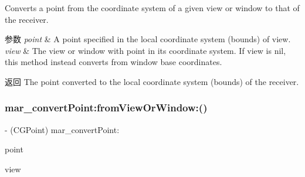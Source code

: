 Converts a point from the coordinate system of a given view or window to that of the receiver.


\begin{DoxyParams}{参数}
{\em point} & A point specified in the local coordinate system (bounds) of view. \\
\hline
{\em view} & The view or window with point in its coordinate system. If view is nil, this method instead converts from window base coordinates. \\
\hline
\end{DoxyParams}
\begin{DoxyReturn}{返回}
The point converted to the local coordinate system (bounds) of the receiver. 
\end{DoxyReturn}
\mbox{\label{category_u_i_view_07_m_a_r_e_x_08_a7c06e8f8cfa0ac108deb3fcbeb59fee9}} 
\subsubsection{\texorpdfstring{mar\+\_\+convert\+Point\+:from\+View\+Or\+Window\+:()}{mar\_convertPoint:fromViewOrWindow:()}\hspace{0.1cm}{\footnotesize\ttfamily [2/2]}}
{\footnotesize\ttfamily -\/ (C\+G\+Point) mar\+\_\+convert\+Point\+: \begin{DoxyParamCaption}\item[{(C\+G\+Point)}]{point }\item[{fromViewOrWindow:(U\+I\+View $\ast$)}]{view }\end{DoxyParamCaption}\hspace{0.3cm}{\ttfamily [implementation]}}

\mbox{\label{category_u_i_view_07_m_a_r_e_x_08_aa7d0c4d5050032bbac130b4acb37607f}} 
